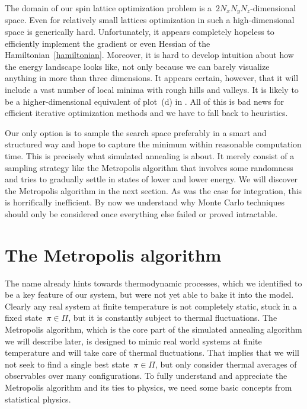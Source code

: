 The domain of our spin lattice optimization problem is a~$2 N_x N_y
N_z$-dimensional space. Even for relatively small lattices optimization in such
a high-dimensional space is generically hard. Unfortunately, it appears
completely hopeless to efficiently implement the gradient or even Hessian of the
Hamiltonian~\eqref{hamiltonian}. Moreover, it is hard to develop intuition about
how the energy landscape looks like, not only because we can barely visualize
anything in more than three dimensions. It appears certain, however, that it
will include a vast number of local minima with rough hills and valleys. It is
likely to be a higher-dimensional equivalent of plot~(d) in
. All of this is bad news for efficient iterative
optimization methods and we have to fall back to heuristics.

Our only option is to sample the search space preferably in a smart and
structured way and hope to capture the minimum within reasonable computation
time. This is precisely what simulated annealing is about. It merely consist of
a sampling strategy like the Metropolis algorithm that involves some randomness
and tries to gradually settle in states of lower and lower energy. We will
discover the Metropolis algorithm in the next section. As was the case for
integration, this is horrifically inefficient. By now we understand why Monte
Carlo techniques should only be considered once everything else failed or proved
intractable.
%
\section{The Metropolis algorithm}\label{sec:metropolis}
%
The name  already hints towards thermodynamic
processes, which we identified to be a key feature of our system, but were not
yet able to bake it into the model. Clearly any real system at finite
temperature is not completely static, \ie{} stuck in a fixed state~$\pi \in
\Pi$, but it is constantly subject to thermal fluctuations. The Metropolis
algorithm, which is the core part of the simulated annealing algorithm we will
describe later, is designed to mimic real world systems at finite temperature
and will take care of thermal fluctuations. That implies that we will not seek
to find a single best state~$\pi \in \Pi$, but only consider thermal averages of
observables over many configurations. To fully understand and appreciate the
Metropolis algorithm and its ties to physics, we need some basic concepts from
statistical physics.

